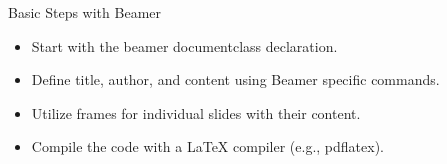 \begin{slide}{Basic Steps with Beamer}
  \begin{itemize}
    \item Start with the beamer documentclass declaration.
    \item Define title, author, and content using Beamer specific commands.
    \item Utilize frames for individual slides with their content.
    \item Compile the code with a LaTeX compiler (e.g., pdflatex).
  \end{itemize}
\end{slide}




